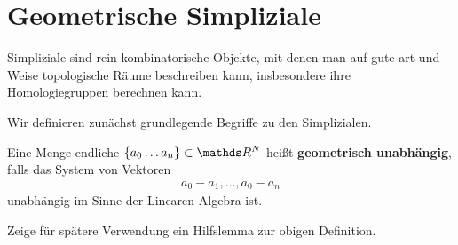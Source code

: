 





\section{Geometrische Simpliziale}

Simpliziale sind rein kombinatorische Objekte, mit denen man auf gute
art und Weise topologische Räume beschreiben kann, insbesondere ihre
Homologiegruppen berechnen kann.

Wir definieren zunächst grundlegende Begriffe zu den Simplizialen.

\begin{Def}
  Eine Menge endliche $\{ a_0\ldots a_n \} \subset \R^N$ heißt
  \textbf{geometrisch unabhängig}, falls das System von Vektoren
  \begin{gather*}
    a_0 - a_1 , \ldots , a_0 - a_n
  \end{gather*}
  unabhängig im Sinne der Linearen Algebra ist.

\end{Def}

Zeige für spätere Verwendung ein Hilfslemma zur obigen Definition.

